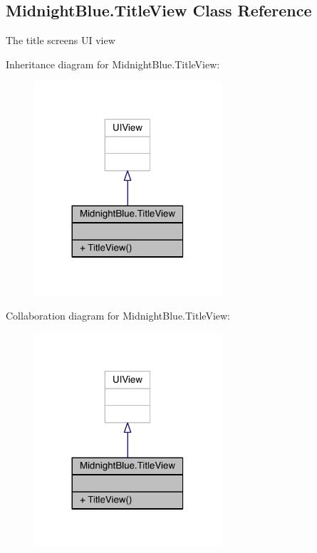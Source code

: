 \hypertarget{class_midnight_blue_1_1_title_view}{}\subsection{Midnight\+Blue.\+Title\+View Class Reference}
\label{class_midnight_blue_1_1_title_view}


The title screens UI view  




Inheritance diagram for Midnight\+Blue.\+Title\+View\+:\nopagebreak
\begin{figure}[H]
\begin{center}
\leavevmode
\includegraphics[width=197pt]{class_midnight_blue_1_1_title_view__inherit__graph}
\end{center}
\end{figure}


Collaboration diagram for Midnight\+Blue.\+Title\+View\+:\nopagebreak
\begin{figure}[H]
\begin{center}
\leavevmode
\includegraphics[width=197pt]{class_midnight_blue_1_1_title_view__coll__graph}
\end{center}
\end{figure}

